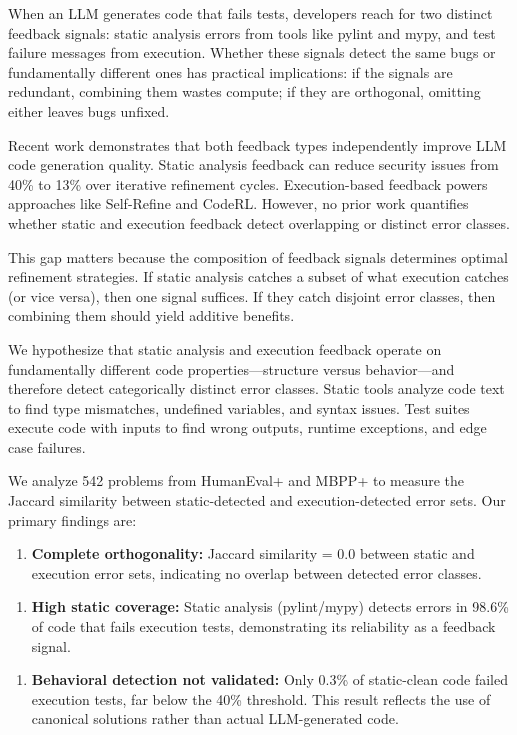 
When an LLM generates code that fails tests, developers reach for two distinct feedback signals: static analysis errors from tools like pylint and mypy, and test failure messages from execution. Whether these signals detect the same bugs or fundamentally different ones has practical implications: if the signals are redundant, combining them wastes compute; if they are orthogonal, omitting either leaves bugs unfixed.

Recent work demonstrates that both feedback types independently improve LLM code generation quality. Static analysis feedback can reduce security issues from 40\% to 13\% over iterative refinement cycles. Execution-based feedback powers approaches like Self-Refine and CodeRL. However, no prior work quantifies whether static and execution feedback detect overlapping or distinct error classes.

This gap matters because the composition of feedback signals determines optimal refinement strategies. If static analysis catches a subset of what execution catches (or vice versa), then one signal suffices. If they catch disjoint error classes, then combining them should yield additive benefits.

We hypothesize that static analysis and execution feedback operate on fundamentally different code properties---structure versus behavior---and therefore detect categorically distinct error classes. Static tools analyze code text to find type mismatches, undefined variables, and syntax issues. Test suites execute code with inputs to find wrong outputs, runtime exceptions, and edge case failures.

We analyze 542 problems from HumanEval+ and MBPP+ to measure the Jaccard similarity between static-detected and execution-detected error sets. Our primary findings are:

\begin{enumerate}
\item \textbf{Complete orthogonality:} Jaccard similarity = 0.0 between static and execution error sets, indicating no overlap between detected error classes.
\end{enumerate}

\begin{enumerate}
\item \textbf{High static coverage:} Static analysis (pylint/mypy) detects errors in 98.6\% of code that fails execution tests, demonstrating its reliability as a feedback signal.
\end{enumerate}

\begin{enumerate}
\item \textbf{Behavioral detection not validated:} Only 0.3\% of static-clean code failed execution tests, far below the 40\% threshold. This result reflects the use of canonical solutions rather than actual LLM-generated code.
\end{enumerate}

